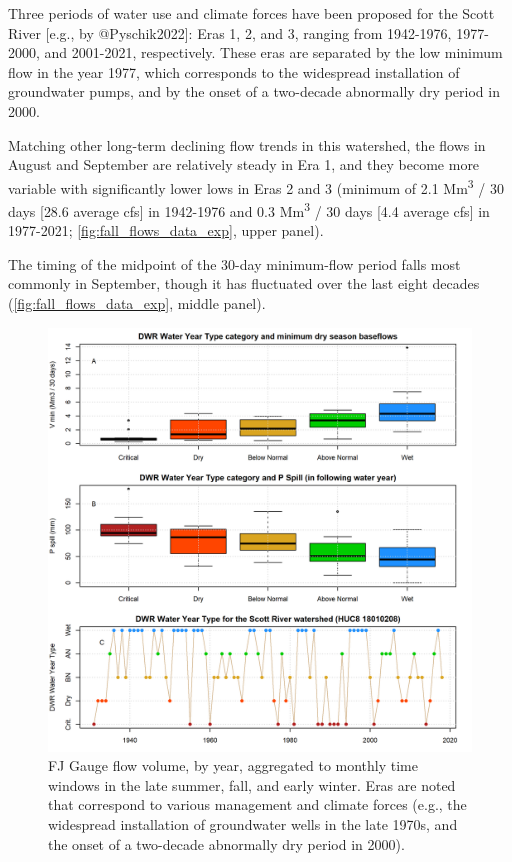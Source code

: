 \documentclass[
]{article}
\begin{document}
Three periods of water use and climate forces have been proposed for the
Scott River {[}e.g., by @Pyschik2022{]}: Eras 1, 2, and 3, ranging from
1942-1976, 1977-2000, and 2001-2021, respectively. These eras are
separated by the low minimum flow in the year 1977, which corresponds to
the widespread installation of groundwater pumps, and by the onset of a
two-decade abnormally dry period in 2000.

Matching other long-term declining flow trends in this watershed, the
flows in August and September are relatively steady in Era 1, and they
become more variable with significantly lower lows in Eras 2 and 3
(minimum of 2.1 Mm\textsuperscript{3} / 30 days {[}28.6 average cfs{]}
in 1942-1976 and 0.3 Mm\textsuperscript{3} / 30 days {[}4.4 average
cfs{]} in 1977-2021; \autoref{fig:fall_flows_data_exp}, upper panel).

The timing of the midpoint of the 30-day minimum-flow period falls most
commonly in September, though it has fluctuated over the last eight
decades (\autoref{fig:fall_flows_data_exp}, middle panel).

\begin{figure}
\includegraphics[width=1\linewidth]{f07} \caption{\label{fig:fall_flows_data_exp} FJ Gauge flow volume, by year, aggregated to monthly time windows in the late summer, fall, and early winter. Eras are noted that correspond to various management and climate forces (e.g., the widespread installation of groundwater wells in the late 1970s, and the onset of a two-decade abnormally dry period in 2000). }\label{fig:fall_flows_data_exp}
\end{figure}
\end{document}
